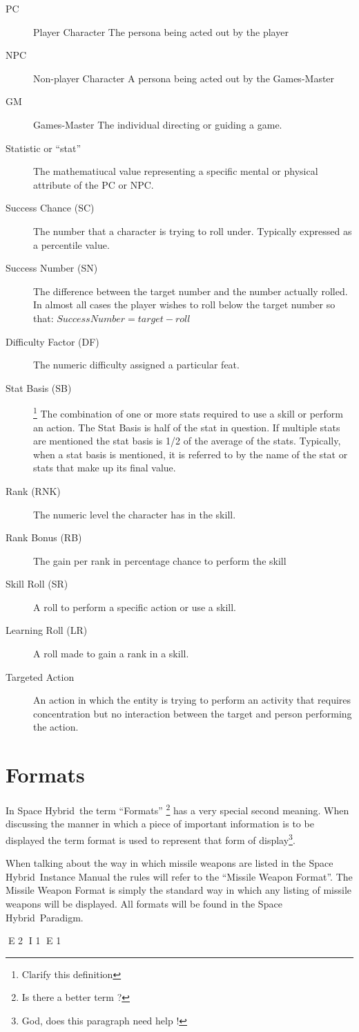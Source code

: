 \begin{description}
	\item[PC] Player Character 
    The persona being acted out by the player
    \item[NPC] Non-player Character
    A persona being acted out by the Games-Master
    \item[GM] Games-Master
    The individual directing or guiding a game.
    \item[Statistic or ``stat'']
    The mathematiucal value representing a specific mental or 
	physical attribute of the PC or NPC.
	\item[Success Chance (SC)] 
	The number that a character is trying to roll under. 
	Typically expressed as a percentile value.
	\item[Success Number (SN)] 
	The difference between the target number and the number actually rolled. In
	almost all cases the player wishes to roll below the target number so that:
	\(Success Number = target - roll\)
	\item[Difficulty Factor (DF)] 
	The numeric difficulty assigned a particular feat.
	\item[Stat Basis (SB)] \footnote{Clarify this definition}
	The combination of one or more stats required to use a skill or perform an
    action. The Stat Basis is half of the stat in question. If 
	multiple stats are mentioned the stat basis is 1/2 of the average 
	of the stats. Typically, when a stat basis is mentioned, it is referred 
	to by the name of the stat or stats that make up its final value.
	\item[Rank (RNK)] 
	The numeric level the character has in the skill.
	\item[Rank Bonus (RB)]
	The gain per rank in percentage chance to perform the skill
	\item[Skill Roll (SR)]
	A roll to perform a specific action or use a skill.
	\item[Learning Roll (LR)]
	A roll made to gain a rank in a skill.
	\item[Targeted Action] 
	An action in which the entity is trying to perform an activity 
	that requires concentration but no interaction between the target 
	and person performing the action.
\end{description}

\section{Formats}

In Space Hybrid\ the term ``Formats'' \footnote{Is there a better term ? }
has a very special second meaning. When discussing the manner in 
which a piece of important information is to be displayed the term 
format is used to represent that form of display\footnote{God, does 
this paragraph need help !}. 

When talking about the way in which missile weapons are listed in the 
Space Hybrid\ Instance Manual the rules will refer to the 
``Missile Weapon Format''. The Missile Weapon Format is simply the 
standard way in which any listing of missile weapons will be displayed.
All formats will be found in the Space Hybrid\ Paradigm.


E 2
I 1
E 1
